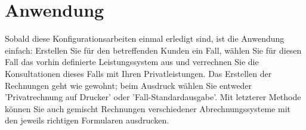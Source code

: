 \documentclass[a4paper]{scrartcl}
\begin{document}
\section{Anwendung}
Sobald diese Konfigurationsarbeiten einmal erledigt sind, ist die Anwendung einfach: Erstellen Sie für den betreffenden Kunden ein Fall, wählen Sie für diesen Fall das vorhin definierte Leistungssystem aus und verrechnen Sie die Konsultationen dieses Falls mit Ihren Privatleistungen. Das Erstellen der Rechnungen geht wie gewohnt; beim Ausdruck wählen Sie entweder 'Privatrechnung auf Drucker' oder 'Fall-Standardausgabe'. Mit letzterer Methode können Sie auch gemischt Rechnungen verschiedener Abrechnungssysteme mit den jeweils richtigen Formularen ausdrucken.
\end{document}
